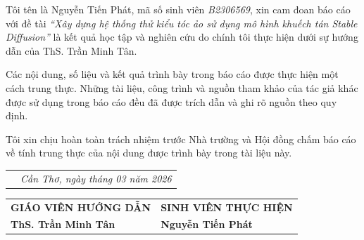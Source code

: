 \documentclass[../main.tex]{subfiles}
\begin{document}
Tôi tên là Nguyễn Tiến Phát, mã số sinh viên \textit{B2306569}, xin cam đoan báo cáo với đề tài \textit{``Xây dựng hệ thống thử kiểu tóc ảo sử dụng mô hình khuếch tán Stable Diffusion''} là kết quả học tập và nghiên cứu do chính tôi thực hiện dưới sự hướng dẫn của ThS. Trần Minh Tân.

Các nội dung, số liệu và kết quả trình bày trong báo cáo được thực hiện một cách trung thực. Những tài liệu, công trình và nguồn tham khảo của tác giả khác được sử dụng trong báo cáo đều đã được trích dẫn và ghi rõ nguồn theo quy định.

Tôi xin chịu hoàn toàn trách nhiệm trước Nhà trường và Hội đồng chấm báo cáo về tính trung thực của nội dung được trình bày trong tài liệu này.

\vfill

\begin{tabular}{p{7cm} p{8cm}}
    & \centering \it Cần Thơ, ngày \quad tháng 03 năm 2026
\end{tabular}

\vspace{0.5cm}

\begin{tabular}{p{7cm} p{8cm}}
    \centering \textbf{GIÁO VIÊN HƯỚNG DẪN} & \centering \textbf{SINH VIÊN THỰC HIỆN} \tabularnewline[1.5cm]
    \centering \textbf{ThS. Trần Minh Tân} & \centering \textbf{Nguyễn Tiến Phát} \\
\end{tabular}
\end{document}
